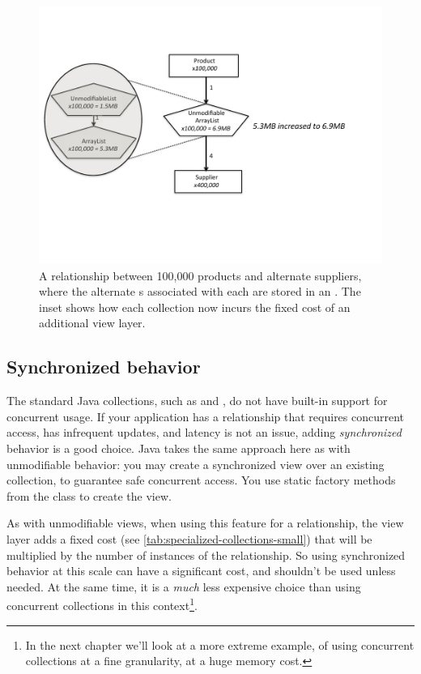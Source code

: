 \begin{figure}
  \centering
 \includegraphics[width=.80\textwidth]{part1/Figures/collections/product-unmodifiable-arraylist.pdf}
 \caption{A relationship between 100,000 products and alternate suppliers,
 where the alternate s associated with each
  are stored in an . The inset
 shows how each collection now incurs the fixed cost of an additional
 view layer.}
  \label{fig:product-unmodifiable-arraylist}
\end{figure}



\subsection{Synchronized behavior}
\label{sec:synchronized-collections}
The standard Java collections, such as  and , do
not have built-in support for concurrent usage. If your application has a
relationship that requires concurrent access, has infrequent updates, and
latency is not an issue, adding \emph{synchronized} behavior is a good choice.  
Java takes the same approach here as with unmodifiable behavior: you may create
a synchronized view over an existing collection, to guarantee safe concurrent
access. You use static factory methods from the  class to
create the view.

As with unmodifiable views, when using this feature for a relationship, the
view layer adds a fixed cost (see \autoref{tab:specialized-collections-small}) that will be multiplied by
the number of instances of the relationship. So using synchronized behavior at this scale can
have a significant cost, and shouldn't be used unless needed. At the same time, it is
a \emph{much} less expensive choice than using concurrent collections in this
context\footnote{In the next chapter we'll look at a more extreme example,
of using concurrent collections at a fine granularity, at a huge memory cost.}.

